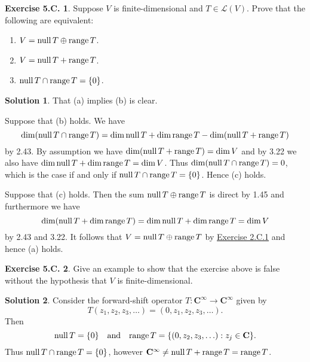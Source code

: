 \documentclass[12pt]{article}
\theoremstyle{definition}
\theoremstyle{exercise}
\newtheorem{exercise}{Exercise 5.C.}
\theoremstyle{solution}
\newtheorem*{solution}{Solution}
\newcommand{\lmap}{\mathcal{L}}
\newcommand{\Null}{\text{null\,}}
\newcommand{\Range}{\text{range\,}}
\newcommand{\quand}{\quad \text{and} \quad}
\newcommand{\C}{\mathbf{C}}
\begin{document}
\begin{exercise}
\label{ex:3}
    Suppose \( V \) is finite-dimensional and \( T \in \lmap(V) \). Prove that the following are equivalent:
    \begin{enumerate}
        \item \( V = \Null T \oplus \Range T \).

        \item \( V = \Null T + \Range T \).

        \item \( \Null T \cap \Range T = \{ 0 \} \).
    \end{enumerate}
\end{exercise}

\begin{solution}
    That (a) implies (b) is clear.
    
    Suppose that (b) holds. We have
    \[
        \dim (\Null T \cap \Range T) = \dim \Null T + \dim \Range T - \dim (\Null T + \Range T)
    \]
    by 2.43. By assumption we have \( \dim (\Null T + \Range T) = \dim V \) and by 3.22 we also have \( \dim \Null T + \dim \Range T = \dim V \). Thus \( \dim (\Null T \cap \Range T) = 0 \), which is the case if and only if \( \Null T \cap \Range T = \{ 0 \} \). Hence (c) holds.

    Suppose that (c) holds. Then the sum \( \Null T \oplus \Range T \) is direct by 1.45 and furthermore we have
    \[
        \dim (\Null T + \dim \Range T) = \dim \Null T + \dim \Range T = \dim V
    \]
    by 2.43 and 3.22. It follows that \( V = \Null T \oplus \Range T \) by \href{https://lew98.github.io/Mathematics/LADR_Section_2_C_Exercises.pdf}{Exercise 2.C.1} and hence (a) holds.
\end{solution}

\begin{exercise}
\label{ex:4}
    Give an example to show that the exercise above is false without the hypothesis that \( V \) is finite-dimensional.
\end{exercise}

\begin{solution}
    Consider the forward-shift operator \( T : \C^{\infty} \to \C^{\infty} \) given by
    \[
        T(z_1, z_2, z_3, \ldots) = (0, z_1, z_2, z_3, \ldots).
    \]
    Then
    \[
        \Null T = \{ 0 \} \quand \Range T = \{ (0, z_2, z_3, \ldots) : z_j \in \C \}.
    \]
    Thus \( \Null T \cap \Range T = \{ 0 \} \), however \( \C^{\infty} \neq \Null T + \Range T = \Range T \).
\end{solution}
\end{document}
